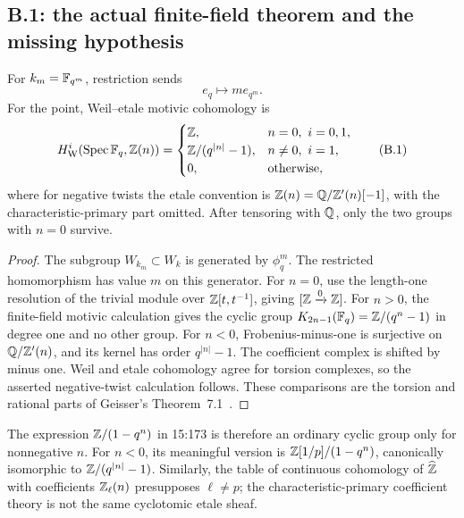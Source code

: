\subsection{B.1: the actual finite-field theorem and the missing hypothesis}

\begin{proposition}\label{prop:B-e}
For \(k_m=\mathbb F_{q^m}\), restriction sends
\[
 e_q\longmapsto m e_{q^m}.
\]
For the point, Weil--etale motivic cohomology is
\[
H^i_{\mathrm W}(\operatorname{Spec}\mathbb F_q,\mathbb Z(n))=
\begin{cases}
\mathbb Z,&n=0,\ i=0,1,\\
\mathbb Z/(q^{|n|}-1),&n\ne0,\ i=1,\\
0,&\text{otherwise},
\end{cases}\tag{B.1}
\]
where for negative twists the etale convention is
\(\mathbb Z(n)=\mathbb Q/\mathbb Z'(n)[-1]\), with the characteristic-primary part omitted.
After tensoring with \(\mathbb Q\), only the two groups with \(n=0\) survive.
\end{proposition}
\begin{proof}
The subgroup \(W_{k_m}\subset W_k\) is generated by \(\phi_q^m\).
The restricted homomorphism has value \(m\) on this generator.  For
\(n=0\), use the length-one resolution of the trivial module over
\(\mathbb Z[t,t^{-1}]\), giving \([\mathbb Z\xrightarrow{0}\mathbb Z]\).
For \(n>0\), the finite-field motivic calculation gives the cyclic group
\(K_{2n-1}(\mathbb F_q)=\mathbb Z/(q^n-1)\) in degree one and no other group.
For \(n<0\), Frobenius-minus-one is surjective on
\(\mathbb Q/\mathbb Z'(n)\), and its kernel has order \(q^{|n|}-1\).
The coefficient complex is shifted by minus one.  Weil and etale
cohomology agree for torsion complexes, so the asserted negative-twist
calculation follows.  These comparisons are the torsion and rational
parts of Geisser's Theorem~7.1~\cite{BGeisser2004}.
\end{proof}

The expression \(\mathbb Z/(1-q^n)\) in 15:173 is therefore an ordinary cyclic
group only for nonnegative \(n\).  For \(n<0\), its meaningful version is
\(\mathbb Z[1/p]/(1-q^n)\), canonically isomorphic to
\(\mathbb Z/(q^{|n|}-1)\).  Similarly, the table of continuous cohomology of
\(\widehat{\mathbb Z}\) with coefficients \(\mathbb Z_\ell(n)\) presupposes
\(\ell\ne p\); the characteristic-primary coefficient theory is not
the same cyclotomic etale sheaf.

